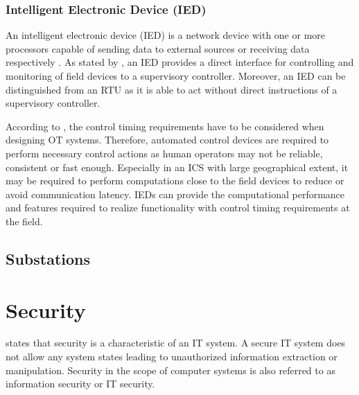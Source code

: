 \subsubsection{Intelligent Electronic Device (IED)}
An intelligent electronic device (IED) is a network device with one or more processors capable of sending data to external sources or receiving data respectively \cite{aga2006}.
As stated by \citeauthor{Stouffer2023} \cite{Stouffer2023}, an IED provides a direct interface for controlling and monitoring of field devices to a supervisory controller.
Moreover, an IED can be distinguished from an RTU as it is able to act without direct instructions of a supervisory controller.

According to \citeauthor{Stouffer2023}, the control timing requirements have to be considered when designing OT systems.
Therefore, automated control devices are required to perform necessary control actions as human operators may not be reliable, consistent or fast enough.
Especially in an ICS with large geographical extent, it may be required to perform computations close to the field devices to reduce or avoid communication latency.
IEDs can provide the computational performance and features required to realize functionality with control timing requirements at the field.

\subsection{Substations}

\section{Security}
\label{sec:security}
\citeauthor{Eckert2023} \cite{Eckert2023} states that security is a characteristic of an IT system.
A secure IT system does not allow any system states leading to unauthorized information extraction or manipulation.
Security in the scope of computer systems is also referred to as information security or IT security.

